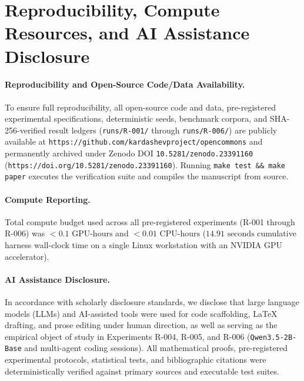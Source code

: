 \documentclass[10pt,twocolumn]{article}
\begin{document}
\section*{Reproducibility, Compute Resources, and AI Assistance Disclosure}

\paragraph{Reproducibility and Open-Source Code/Data Availability.}
To ensure full reproducibility, all open-source code and data, pre-registered experimental specifications, deterministic seeds, benchmark corpora, and SHA-256-verified result ledgers (\texttt{runs/R-001/} through \texttt{runs/R-006/}) are publicly available at \texttt{https://github.com/kardashevproject/opencommons} and permanently archived under Zenodo DOI \texttt{10.5281/zenodo.23391160} (\texttt{https://doi.org/10.5281/zenodo.23391160}). Running \texttt{make test \&\& make paper} executes the verification suite and compiles the manuscript from source.

\paragraph{Compute Reporting.}
Total compute budget used across all pre-registered experiments (R-001 through R-006) was $< 0.1\text{ GPU-hours}$ and $< 0.01\text{ CPU-hours}$ ($14.91\text{ seconds}$ cumulative harness wall-clock time on a single Linux workstation with an NVIDIA GPU accelerator).

\paragraph{AI Assistance Disclosure.}
In accordance with scholarly disclosure standards, we disclose that large language models (LLMs) and AI-assisted tools were used for code scaffolding, LaTeX drafting, and prose editing under human direction, as well as serving as the empirical object of study in Experiments R-004, R-005, and R-006 (\texttt{Qwen3.5-2B-Base} and multi-agent coding sessions). All mathematical proofs, pre-registered experimental protocols, statistical tests, and bibliographic citations were deterministically verified against primary sources and executable test suites.
\end{document}
